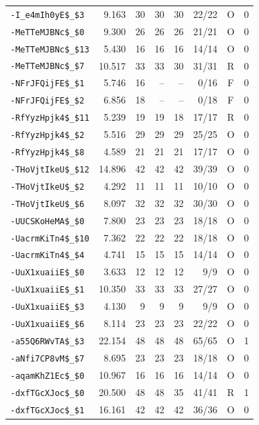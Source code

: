 {\begin{longtable}{lrrrrrcc}
\texttt{-I\_e4mIh0yE\$\_\$3} & 9.163 & 30 & 30 & 30 & 22/22 & O & 0 \\
\texttt{-MeTTeMJBNc\$\_\$0} & 9.300 & 26 & 26 & 26 & 21/21 & O & 0 \\
\texttt{-MeTTeMJBNc\$\_\$13} & 5.430 & 16 & 16 & 16 & 14/14 & O & 0 \\
\texttt{-MeTTeMJBNc\$\_\$7} & 10.517 & 33 & 33 & 30 & 31/31 & R & 0 \\
\texttt{-NFrJFQijFE\$\_\$1} & 5.746 & 16 & -- & -- & 0/16 & F & 0 \\
\texttt{-NFrJFQijFE\$\_\$2} & 6.856 & 18 & -- & -- & 0/18 & F & 0 \\
\texttt{-RfYyzHpjk4\$\_\$11} & 5.239 & 19 & 19 & 18 & 17/17 & R & 0 \\
\texttt{-RfYyzHpjk4\$\_\$2} & 5.516 & 29 & 29 & 29 & 25/25 & O & 0 \\
\texttt{-RfYyzHpjk4\$\_\$8} & 4.589 & 21 & 21 & 21 & 17/17 & O & 0 \\
\texttt{-THoVjtIkeU\$\_\$12} & 14.896 & 42 & 42 & 42 & 39/39 & O & 0 \\
\texttt{-THoVjtIkeU\$\_\$2} & 4.292 & 11 & 11 & 11 & 10/10 & O & 0 \\
\texttt{-THoVjtIkeU\$\_\$6} & 8.097 & 32 & 32 & 32 & 30/30 & O & 0 \\
\texttt{-UUCSKoHeMA\$\_\$0} & 7.800 & 23 & 23 & 23 & 18/18 & O & 0 \\
\texttt{-UacrmKiTn4\$\_\$10} & 7.362 & 22 & 22 & 22 & 18/18 & O & 0 \\
\texttt{-UacrmKiTn4\$\_\$4} & 4.741 & 15 & 15 & 15 & 14/14 & O & 0 \\
\texttt{-UuX1xuaiiE\$\_\$0} & 3.633 & 12 & 12 & 12 & 9/9 & O & 0 \\
\texttt{-UuX1xuaiiE\$\_\$1} & 10.350 & 33 & 33 & 33 & 27/27 & O & 0 \\
\texttt{-UuX1xuaiiE\$\_\$3} & 4.130 & 9 & 9 & 9 & 9/9 & O & 0 \\
\texttt{-UuX1xuaiiE\$\_\$6} & 8.114 & 23 & 23 & 23 & 22/22 & O & 0 \\
\texttt{-a55Q6RWvTA\$\_\$3} & 22.154 & 48 & 48 & 48 & 65/65 & O & 1 \\
\texttt{-aNfi7CP8vM\$\_\$7} & 8.695 & 23 & 23 & 23 & 18/18 & O & 0 \\
\texttt{-aqamKhZ1Ec\$\_\$0} & 10.967 & 16 & 16 & 16 & 14/14 & O & 0 \\
\texttt{-dxfTGcXJoc\$\_\$0} & 20.500 & 48 & 48 & 35 & 41/41 & R & 1 \\
\texttt{-dxfTGcXJoc\$\_\$1} & 16.161 & 42 & 42 & 42 & 36/36 & O & 0 \\

\end{longtable}}

